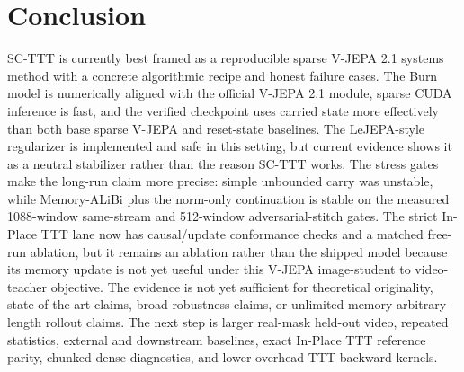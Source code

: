 \documentclass[10pt]{article}
\begin{document}
\section{Conclusion}

SC-TTT is currently best framed as a reproducible sparse V-JEPA 2.1 systems
method with a concrete algorithmic recipe and honest failure cases.  The Burn
model is numerically aligned with the official V-JEPA 2.1 module, sparse CUDA
inference is fast, and the verified checkpoint uses carried state more
effectively than both base sparse V-JEPA and reset-state baselines.  The
LeJEPA-style regularizer is implemented and safe in this setting, but current
evidence shows it as a neutral stabilizer rather than the reason SC-TTT works.
The stress gates make the long-run claim more precise: simple unbounded carry
was unstable, while Memory-ALiBi plus the norm-only continuation is stable on
the measured 1088-window same-stream and 512-window adversarial-stitch gates.
The strict In-Place TTT lane now has causal/update conformance checks and a
matched free-run ablation, but it remains an ablation rather than the shipped
model because its memory update is not yet useful under this V-JEPA
image-student to video-teacher objective.  The evidence is not yet sufficient
for theoretical originality,
state-of-the-art claims, broad robustness claims, or unlimited-memory
arbitrary-length rollout claims.  The next step is larger real-mask held-out
video, repeated statistics, external and downstream baselines, exact In-Place
TTT reference parity, chunked dense diagnostics, and lower-overhead TTT
backward kernels.
\end{document}
